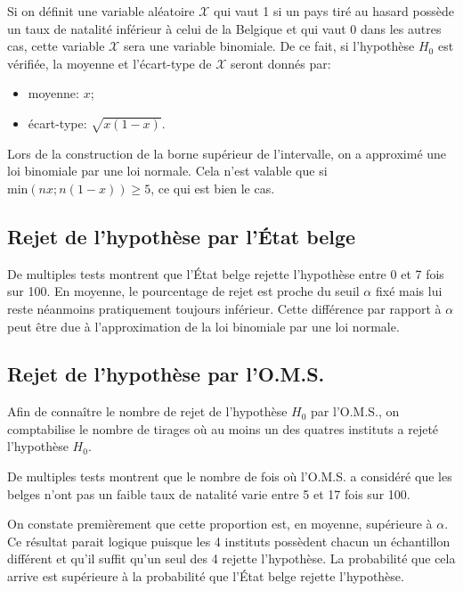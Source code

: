 \documentclass[a4paper, 12pt]{article}
\newcommand{\X}{\mathcal{X}}
\begin{document}
	Si on définit une variable aléatoire \(\X\) qui vaut \num{1} si un pays tiré au hasard possède un taux de natalité inférieur à celui de la Belgique et qui vaut \num{0} dans les autres cas, cette variable \(\X\) sera une variable binomiale. De ce fait, si l'hypothèse \(H_0\) est vérifiée, la moyenne et l'écart-type de \(\X\) seront donnés par:
	
	\begin{itemize}
	    \item moyenne: \(x\);
	    \item écart-type: \(\sqrt{x\left (1-x\right)}\).
	\end{itemize}
	
	Lors de la construction de la borne supérieur de l'intervalle, on a approximé une loi binomiale par une loi normale. Cela n'est valable que si \(\text{min}\left (nx; n\left (1-x\right )\right)\geq 5\), ce qui est bien le cas.
	
	\subsection{Rejet de l'hypothèse par l'État belge}
	\label{subsec:Q4a}
	De multiples tests montrent que l'État belge rejette l'hypothèse entre \num{0} et \num{7} fois sur \num{100}. En moyenne, le pourcentage de rejet est proche du seuil \(\alpha\) fixé mais lui reste néanmoins pratiquement toujours inférieur. Cette différence par rapport à \(\alpha\) peut être due à l'approximation de la loi binomiale par une loi normale.
	
	\subsection{Rejet de l'hypothèse par l'O.M.S.}
	Afin de connaître le nombre de rejet de l'hypothèse \(H_0\) par l'O.M.S., on comptabilise le nombre de tirages où au moins un des quatres instituts a rejeté l'hypothèse \(H_0\).\par
	
	De multiples tests montrent que le nombre de fois où l'O.M.S. a considéré que les belges n'ont pas un faible taux de natalité varie entre \num{5} et \num{17} fois sur \num{100}.\par
	
	On constate premièrement que cette proportion est, en moyenne, supérieure à \(\alpha\). Ce résultat parait logique puisque les 4 instituts possèdent chacun un échantillon différent et qu'il suffit qu'un seul des 4 rejette l'hypothèse. La probabilité que cela arrive est supérieure à la probabilité que l'État belge rejette l'hypothèse.\par
	
\end{document}
